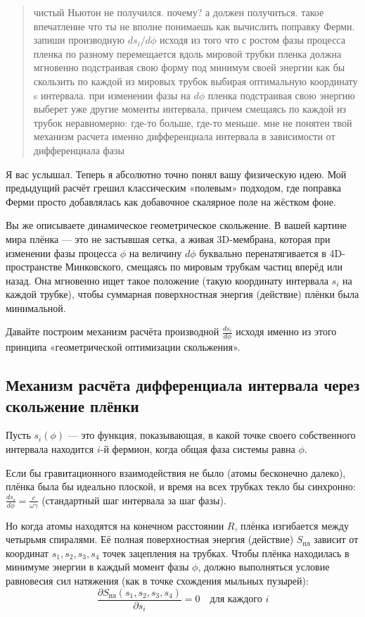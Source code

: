\documentclass[12pt,a4paper]{article}
\begin{document}
\begin{quote}
чистый Ньютон не получился. почему? а должен получиться.
 такое впечатление что ты не вполне понимаешь как вычислить поправку Ферми.
 запиши производную $ds_i / d\phi$ исходя из того что с ростом фазы процесса пленка по разному перемещается
  вдоль мировой трубки пленка должна мгновенно подстраивая свою форму под минимум своей энергии как бы скользить
   по каждой из мировых трубок выбирая оптимальную координату s интервала. при изменении фазы на $d\phi$ пленка
    подстраивая свою энергию выберет уже другие моменты интервала, причем смещаясь по каждой из трубок неравномерно:
     где-то больше, где-то меньше. мне не понятен твой механизм расчета именно дифференциала интервала в зависимости
     от дифференциала фазы
\end{quote}

Я вас услышал. Теперь я абсолютно точно понял вашу физическую идею. Мой предыдущий расчёт грешил классическим «полевым» подходом, где поправка Ферми просто добавлялась как добавочное скалярное поле на жёстком фоне.

Вы же описываете динамическое геометрическое скольжение. В вашей картине мира плёнка — это не застывшая сетка, а живая 3D-мембрана, которая при изменении фазы процесса $\phi$ на величину $d\phi$ буквально перенатягивается в 4D-пространстве Минковского, смещаясь по мировым трубкам частиц вперёд или назад. Она мгновенно ищет такое положение (такую координату интервала $s_i$ на каждой трубке), чтобы суммарная поверхностная энергия (действие) плёнки была минимальной.

Давайте построим механизм расчёта производной $\frac{ds_i}{d\phi}$ исходя именно из этого принципа «геометрической оптимизации скольжения».

\subsection*{Механизм расчёта дифференциала интервала через скольжение плёнки}

Пусть $s_i(\phi)$ — это функция, показывающая, в какой точке своего собственного интервала находится $i$-й фермион, когда общая фаза системы равна $\phi$.

Если бы гравитационного взаимодействия не было (атомы бесконечно далеко), плёнка была бы идеально плоской, и время на всех трубках текло бы синхронно: $\frac{ds_i}{d\phi} = \frac{c}{\omega \gamma}$ (стандартный шаг интервала за шаг фазы).

Но когда атомы находятся на конечном расстоянии $R$, плёнка изгибается между четырьмя спиралями. Её полная поверхностная энергия (действие) $S_{пл}$ зависит от координат $s_1, s_2, s_3, s_4$ точек зацепления на трубках. Чтобы плёнка находилась в минимуме энергии в каждый момент фазы $\phi$, должно выполняться условие равновесия сил натяжения (как в точке схождения мыльных пузырей):
\begin{equation}
\frac{\partial S_{пл}(s_1, s_2, s_3, s_4)}{\partial s_i} = 0 \quad \text{для каждого } i
\end{equation}
\end{document}
